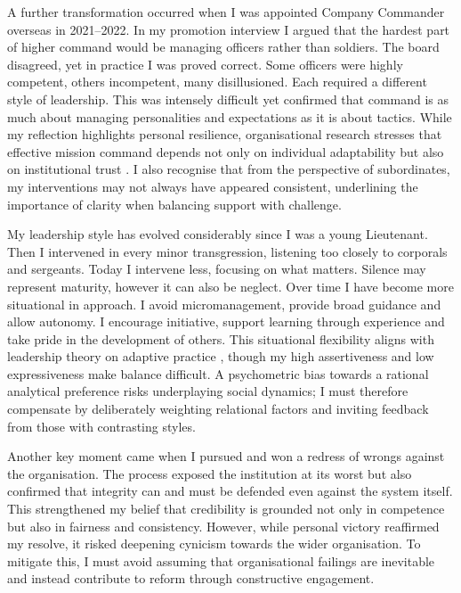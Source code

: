 A further transformation occurred when I was appointed Company Commander overseas in 2021–2022. In my promotion interview I argued that the hardest part of higher command would be managing officers rather than soldiers. The board disagreed, yet in practice I was proved correct. Some officers were highly competent, others incompetent, many disillusioned. Each required a different style of leadership. This was intensely difficult yet confirmed that command is as much about managing personalities and expectations as it is about tactics. While my reflection highlights personal resilience, organisational research stresses that effective mission command depends not only on individual adaptability but also on institutional trust \parencite{BACHMANN_2015}. I also recognise that from the perspective of subordinates, my interventions may not always have appeared consistent, underlining the importance of clarity when balancing support with challenge.  

My leadership style has evolved considerably since I was a young Lieutenant. Then I intervened in every minor transgression, listening too closely to corporals and sergeants. Today I intervene less, focusing on what matters. Silence may represent maturity, however it can also be neglect. Over time I have become more situational in approach. I avoid micromanagement, provide broad guidance and allow autonomy. I encourage initiative, support learning through experience and take pride in the development of others. This situational flexibility aligns with leadership theory on adaptive practice \parencite{HEIFETZ_2002}, though my high assertiveness and low expressiveness \parencite{EMERGENETICS_2025} make balance difficult. A psychometric bias towards a rational analytical preference risks underplaying social dynamics; I must therefore compensate by deliberately weighting relational factors and inviting feedback from those with contrasting styles.  

Another key moment came when I pursued and won a redress of wrongs against the organisation. The process exposed the institution at its worst but also confirmed that integrity can and must be defended even against the system itself. This strengthened my belief that credibility is grounded not only in competence but also in fairness and consistency. However, while personal victory reaffirmed my resolve, it risked deepening cynicism towards the wider organisation. To mitigate this, I must avoid assuming that organisational failings are inevitable and instead contribute to reform through constructive engagement.  

